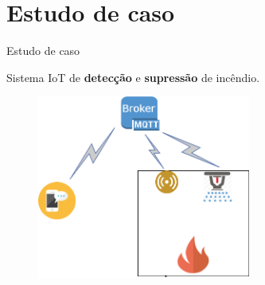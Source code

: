 \documentclass[12pt,xcolor={usenames,dvipsnames}]{beamer}
\begin{document}
\section{Estudo de caso}
\begin{frame}{Estudo de caso}
\begin{beamerboxesrounded}{}
	Sistema IoT de \textbf{detecção} e \textbf{supressão} de incêndio.
\end{beamerboxesrounded}

\begin{figure}[ht]
	\centering
	\includegraphics[width=7cm]{./figuras/diagrama_estudo.png}
\end{figure} 
\end{frame}
\end{document}
